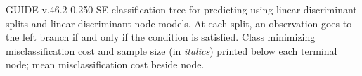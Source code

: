\documentclass[12pt]{article}
\begin{document}
 \begin{center}
 \end{center}
GUIDE v.46.2 0.250-SE
classification tree for predicting \texttt{} using linear discriminant splits and linear discriminant node models.
At each split, an observation goes to the left branch 
 if and only if the condition is satisfied.
Class minimizing misclassification cost
and sample size (in \emph{italics}) printed below each terminal node;
  mean misclassification cost beside node.
 
\end{document}
